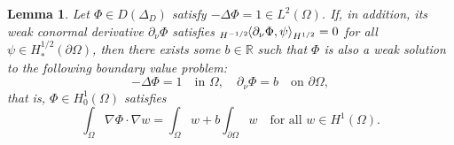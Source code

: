 \documentclass[a4paper,11pt]{article}
\newcommand\restr[2]{{%
\left.\kern-\nulldelimiterspace %
#1 %
\vphantom{|} %
\right|_{#2} %
}}
\newtheorem{lemma}[theorem]{Lemma}
\newcommand{\pairing}[2]{
{}_{{H^{-1/2}}}\hspace*{-1mm}\left\langle #1, #2\right\rangle_{H^{1/2}}
}  %
\numberwithin{equation}{section}
\begin{document}
\begin{lemma}\label{lem weak conormal is weak neumann}
Let $\Phi\in D(\Delta_D)$ satisfy $-\Delta \Phi=1\in L^2(\Omega)$.
If, in addition, its weak conormal derivative $\partial_\nu\Phi$ satisfies $\pairing{\partial_\nu \Phi}{\psi}=0$ for all $\psi\in H_*^{1/2}(\partial\Omega)$, then there exists some $b\in \mathbb{R}$ such that $\Phi$ is also a weak solution to the following boundary value problem:  
\begin{equation*}
 -\Delta \Phi = 1 \quad \text{in }\Omega,\quad  \partial_\nu\Phi = b \quad \text{on }\partial\Omega,   
\end{equation*}
that is, $\Phi\in H_0^1(\Omega)$ satisfies
\begin{equation}\label{weak neu}
 \int_\Omega \nabla\Phi\cdot\nabla w = \int_\Omega w + b\int_{\partial\Omega}w \quad \text{for all }w\in H^1(\Omega).
\end{equation}
\end{lemma}
\end{document}
